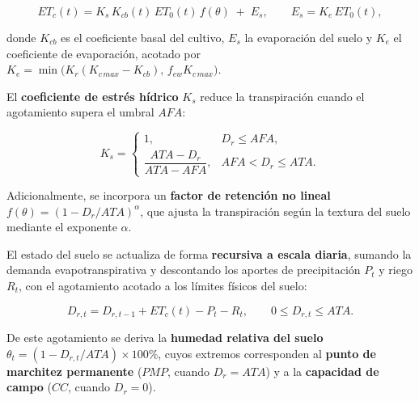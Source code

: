 \documentclass[12pt]{report}
\begin{document}
\begin{equation}
ET_c(t) = K_s\,K_{cb}(t)\,ET_0(t)\,f(\theta) \;+\; E_s,
\qquad
E_s = K_e\,ET_0(t),
\end{equation}

\vspace{0.2cm}

donde $K_{cb}$ es el coeficiente basal del cultivo, $E_s$ la evaporación del suelo y $K_e$ el coeficiente de evaporación, acotado por $K_e=\min\!\big(K_r(K_{c\,max}-K_{cb}),\,f_{ew}K_{c\,max}\big)$.

\vspace{0.2cm}

El \textbf{coeficiente de estrés hídrico} $K_s$ reduce la transpiración cuando el agotamiento supera el umbral $AFA$:

\vspace{0.2cm}

\begin{equation}
K_s =
\begin{cases}
1, & D_r \le AFA,\\[4pt]
\dfrac{ATA - D_r}{ATA - AFA}, & AFA < D_r \le ATA.
\end{cases}
\end{equation}

\vspace{0.2cm}

Adicionalmente, se incorpora un \textbf{factor de retención no lineal} $f(\theta)=\left(1 - D_r/ATA\right)^{\alpha}$, que ajusta la transpiración según la textura del suelo mediante el exponente $\alpha$.

\vspace{0.2cm}

El estado del suelo se actualiza de forma \textbf{recursiva a escala diaria}, sumando la demanda evapotranspirativa y descontando los aportes de precipitación $P_t$ y riego $R_t$, con el agotamiento acotado a los límites físicos del suelo:

\vspace{0.2cm}

\begin{equation}
D_{r,t} = D_{r,t-1} + ET_c(t) - P_t - R_t,
\qquad 0 \le D_{r,t} \le ATA.
\end{equation}

\vspace{0.2cm}

De este agotamiento se deriva la \textbf{humedad relativa del suelo} $\theta_t = \left(1 - D_{r,t}/ATA\right)\times 100\%$, cuyos extremos corresponden al \textbf{punto de marchitez permanente} ($PMP$, cuando $D_r=ATA$) y a la \textbf{capacidad de campo} ($CC$, cuando $D_r=0$).
\end{document}
